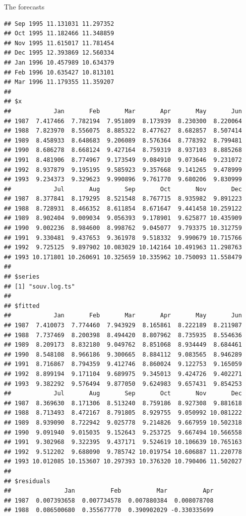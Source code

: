 \documentclass[
  ignorenonframetext,
]{beamer}
\begin{document}
\begin{frame}[fragile]{The forecasts}
\begin{verbatim}
## Sep 1995 11.131031 11.297352
## Oct 1995 11.182466 11.348859
## Nov 1995 11.615017 11.781454
## Dec 1995 12.393869 12.560334
## Jan 1996 10.457989 10.634379
## Feb 1996 10.635427 10.813101
## Mar 1996 11.179355 11.359207
## 
## $x
##            Jan       Feb       Mar       Apr       May       Jun
## 1987  7.417466  7.782194  7.951809  8.173939  8.230300  8.220064
## 1988  7.823970  8.556075  8.885322  8.477627  8.682857  8.507414
## 1989  8.458933  8.648683  9.206089  8.576364  8.778392  8.799481
## 1990  8.686278  8.668124  9.427164  8.759319  8.937103  8.885268
## 1991  8.481906  8.774967  9.173549  9.084910  9.073646  9.231072
## 1992  8.937879  9.195195  9.585923  9.357668  9.141265  9.478999
## 1993  9.234373  9.329623  9.990896  9.761770  9.680206  9.830999
##            Jul       Aug       Sep       Oct       Nov       Dec
## 1987  8.377841  8.179295  8.521548  8.767715  8.935982  9.891223
## 1988  8.728931  8.466352  8.611854  8.671647  9.441458 10.259122
## 1989  8.902404  9.009034  9.056393  9.178901  9.625877 10.435909
## 1990  9.002236  8.984600  8.998762  9.045077  9.793375 10.312759
## 1991  9.330481  9.437653  9.361978  9.518332  9.990679 10.715766
## 1992  9.725125  9.897902 10.083029 10.142164 10.491963 11.298763
## 1993 10.171801 10.260691 10.325659 10.335962 10.750093 11.558479
## 
## $series
## [1] "souv.log.ts"
## 
## $fitted
##            Jan       Feb       Mar       Apr       May       Jun
## 1987  7.410073  7.774460  7.943929  8.165861  8.222189  8.211987
## 1988  7.737469  8.200398  8.494420  8.807962  8.735935  8.554636
## 1989  8.209173  8.832180  9.049762  8.851068  8.934449  8.684461
## 1990  8.548108  8.966186  9.300665  8.884112  9.083565  8.946289
## 1991  8.716867  8.794359  9.412746  8.860024  9.122753  9.165059
## 1992  8.899194  9.171104  9.689975  9.345013  9.424726  9.402271
## 1993  9.382292  9.576494  9.877050  9.624983  9.657431  9.854253
##            Jul       Aug       Sep       Oct       Nov       Dec
## 1987  8.369630  8.171306  8.513240  8.759186  8.927308  9.881618
## 1988  8.713493  8.472167  8.791805  8.929755  9.050992 10.081222
## 1989  8.939090  8.722942  9.025778  9.214826  9.667959 10.502318
## 1990  9.091940  9.015035  9.152643  9.253725  9.667494 10.566558
## 1991  9.302968  9.322395  9.437171  9.524619 10.106639 10.765163
## 1992  9.512202  9.688090  9.785742 10.019754 10.606887 11.220778
## 1993 10.012085 10.153607 10.297393 10.376320 10.790406 11.502027
## 
## $residuals
##               Jan          Feb          Mar          Apr
## 1987  0.007393658  0.007734578  0.007880384  0.008078708
## 1988  0.086500680  0.355677770  0.390902029 -0.330335699

\end{verbatim}
\end{frame}
\end{document}
